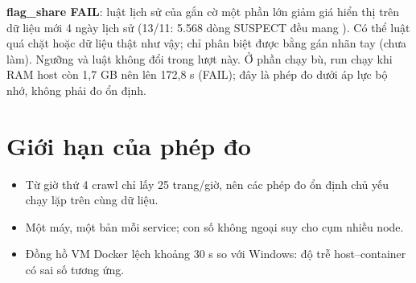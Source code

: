 \begin{riskbox}
\textbf{flag\_share FAIL}: luật lịch sử của  gắn cờ một phần lớn giảm giá hiển thị trên dữ liệu mới 4 ngày lịch sử
(13/11: 5.568 dòng SUSPECT đều mang ). Có thể luật quá chặt hoặc dữ liệu thật như vậy; chỉ phân biệt được bằng gán nhãn tay
(chưa làm). Ngưỡng và luật không đổi trong lượt này. Ở phần chạy bù, run  chạy khi RAM host còn 1,7 GB nên  lên 172,8 s (FAIL);
đây là phép đo dưới áp lực bộ nhớ, không phải đo ổn định.
\end{riskbox}

\section{Giới hạn của phép đo}
\begin{itemize}
  \item Từ giờ thứ 4 crawl chỉ lấy 25 trang/giờ, nên các phép đo ổn định chủ yếu chạy lặp trên cùng dữ liệu.
  \item Một máy, một bản mỗi service; con số không ngoại suy cho cụm nhiều node.
  \item Đồng hồ VM Docker lệch khoảng 30 s so với Windows: độ trễ host--container có sai số tương ứng.
\end{itemize}
